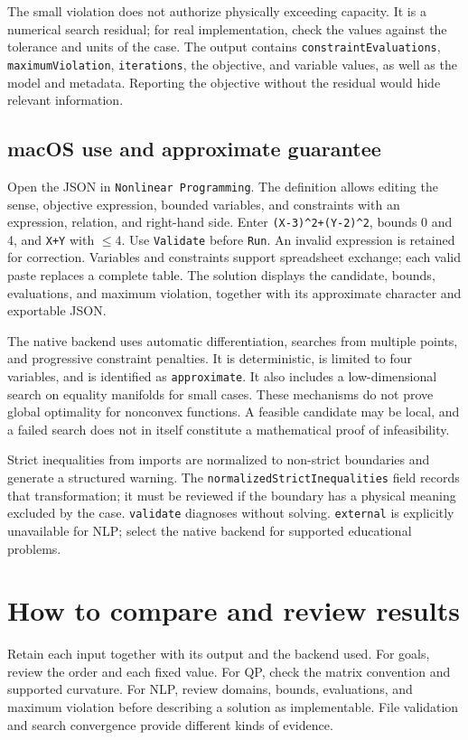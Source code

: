 The small violation does not authorize physically exceeding capacity. It is
a numerical search residual; for real implementation, check the values
against the tolerance and units of the case. The output contains
\texttt{constraintEvaluations}, \texttt{maximumViolation},
\texttt{iterations}, the objective, and variable values, as well as the model
and metadata. Reporting the objective without the residual would hide
relevant information.

\subsection{macOS use and approximate guarantee}
Open the JSON in \texttt{Nonlinear Programming}. The definition allows editing
the sense, objective expression, bounded variables, and constraints with an
expression, relation, and right-hand side. Enter
\texttt{(X-3)\^{}2+(Y-2)\^{}2}, bounds 0 and 4, and \texttt{X+Y} with
\(\leq4\). Use \texttt{Validate} before \texttt{Run}. An invalid expression is
retained for correction. Variables and constraints support spreadsheet
exchange; each valid paste replaces a complete table.
The solution displays the candidate, bounds, evaluations, and maximum
violation, together with its approximate character and exportable JSON.

The native backend uses automatic differentiation, searches from multiple
points, and progressive constraint penalties. It is deterministic, is limited
to four variables, and is identified as \texttt{approximate}. It also includes
a low-dimensional search on equality manifolds for small cases.
These mechanisms do not prove global optimality for nonconvex functions.
A feasible candidate may be local, and a failed search does not in itself
constitute a mathematical proof of infeasibility.

Strict inequalities from imports are normalized to non-strict boundaries
and generate a structured warning. The
\texttt{normalizedStrictInequalities} field records that transformation;
it must be reviewed if the boundary has a physical meaning excluded by the
case. \texttt{validate} diagnoses without solving. \texttt{external} is
explicitly unavailable for NLP; select the native backend for supported
educational problems.

\section{How to compare and review results}
Retain each input together with its output and the backend used. For goals,
review the order and each fixed value. For QP, check the matrix convention
and supported curvature. For NLP, review domains, bounds, evaluations, and
maximum violation before describing a solution as implementable. File
validation and search convergence provide different kinds of evidence.

